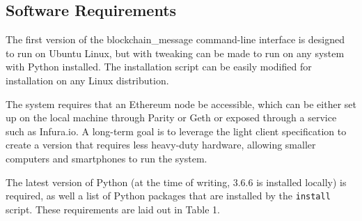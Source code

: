 \documentclass[titlepage]{report}
\begin{document}
\subsection{Software Requirements}
The first version of the blockchain\_message command-line interface is designed to run on Ubuntu Linux, but with tweaking can be made to run on any system with Python installed. The installation script can be easily modified for installation on any Linux distribution.

The system requires that an Ethereum \gls{node} be accessible, which can be either set up on the local machine through Parity or Geth or exposed through a service such as Infura.io. A long-term goal is to leverage the light client specification to create a version that requires less heavy-duty hardware, allowing smaller computers and smartphones to run the system.

The latest version of Python (at the time of writing, 3.6.6 is installed locally) is required, as well a list of Python packages that are installed by the \texttt{install} script. These requirements are laid out in Table 1.
\end{document}
